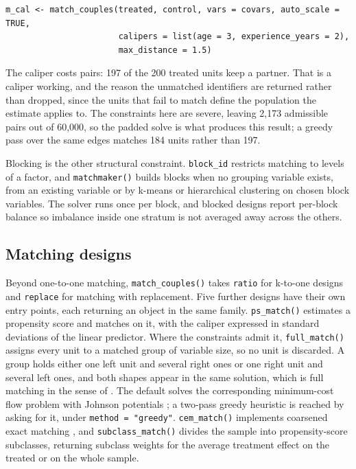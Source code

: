 \begin{verbatim}
m_cal <- match_couples(treated, control, vars = covars, auto_scale = TRUE,
                       calipers = list(age = 3, experience_years = 2),
                       max_distance = 1.5)
\end{verbatim}

The caliper costs pairs: 197 of the 200 treated units keep a
partner. That is a caliper working, and the reason the unmatched identifiers
are returned rather than dropped, since the units that fail to match define
the population the estimate applies to. The constraints here are severe,
leaving 2,173 admissible pairs out of 60,000, so the padded solve is what
produces this result; a greedy pass over the same edges matches
184 units
rather than 197.

Blocking is the other structural constraint. \texttt{block\_id} restricts matching to
levels of a factor, and \texttt{matchmaker()} builds blocks when no grouping variable
exists, from an existing variable or by k-means or hierarchical clustering on
chosen block variables. The solver runs once per block, and blocked designs
report per-block balance so imbalance inside one stratum is not averaged away
across the others.

\subsection{Matching designs}\label{matching-designs}

Beyond one-to-one matching, \texttt{match\_couples()} takes \texttt{ratio} for k-to-one designs
and \texttt{replace} for matching with replacement. Five further designs have their own
entry points, each returning an object in the same family. \texttt{ps\_match()} estimates
a propensity score \citep{RosenbaumRubin1983} and matches on it, with the caliper
expressed in standard deviations of the linear predictor. Where the constraints
admit it, \texttt{full\_match()} assigns every unit to a matched group of variable size,
so no unit is discarded. A group holds either one left unit and several right
ones or one right unit and several left ones, and both shapes appear in the same
solution, which is full matching in the sense of \citet{HansenKlopfer2006}. The default
solves the corresponding
minimum-cost flow problem with Johnson potentials \citep{Johnson1977}; a two-pass
greedy heuristic is reached by asking for it, under \texttt{method\ =\ "greedy"}. \texttt{cem\_match()} implements coarsened exact matching
\citep{IacusKingPorro2012}, and \texttt{subclass\_match()} divides the sample into
propensity-score subclasses, returning subclass weights for the average
treatment effect on the treated or on the whole sample.

